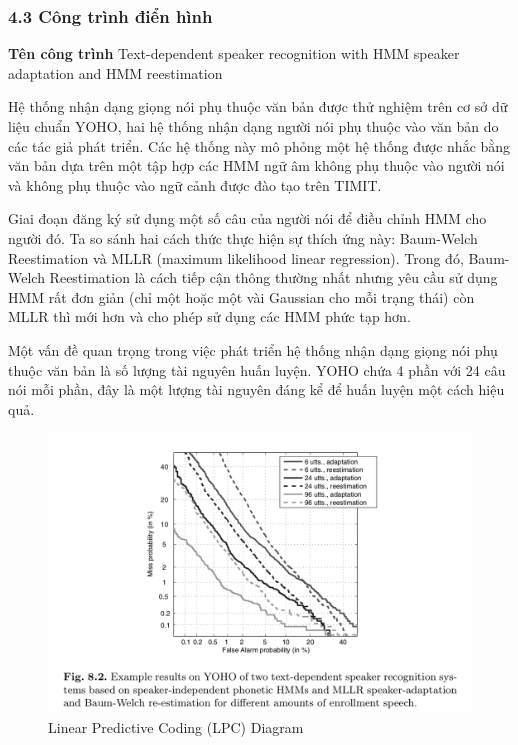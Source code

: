 \documentclass{article}
\begin{document}
	\subsubsection{4.3 Công trình điển hình}
	\textbf{Tên công trình} Text-dependent speaker recognition with HMM speaker adaptation and HMM reestimation 
	
	Hệ thống nhận dạng giọng nói phụ thuộc văn bản được thử nghiệm trên cơ sở dữ liệu chuẩn YOHO, hai hệ thống nhận dạng người nói phụ thuộc vào văn bản do các tác giả phát triển. Các hệ thống này mô phỏng một hệ thống được nhắc bằng văn bản dựa trên một tập hợp các HMM ngữ âm không phụ thuộc vào người nói và không phụ thuộc vào ngữ cảnh được đào tạo trên TIMIT.
	
	Giai đoạn đăng ký sử dụng một số câu của người nói để điều chỉnh HMM cho người đó. Ta so sánh hai cách thức thực hiện sự thích ứng này: Baum-Welch Reestimation và MLLR (maximum likelihood linear regression).
	Trong đó, Baum-Welch Reestimation là cách tiếp cận thông thường nhất nhưng yêu cầu sử dụng HMM rất đơn giản (chỉ một hoặc một vài Gaussian cho mỗi trạng thái) còn MLLR thì mới hơn và cho phép sử dụng các HMM phức tạp hơn.
	
	Một vấn đề quan trọng trong việc phát triển hệ thống nhận dạng giọng nói phụ thuộc văn bản là số lượng tài nguyên huấn luyện. YOHO chứa 4 phần với 24 câu nói mỗi phần, đây là một lượng tài nguyên đáng kể để huấn luyện một cách hiệu quả.
	
	\begin{figure}[H]
		\centering
		\includegraphics[width=1\linewidth]{images/figure_8_2.png}
		\caption{Linear Predictive Coding (LPC) Diagram}
		\label{fig:writing-thesis}
	\end{figure}
		
\end{document}

